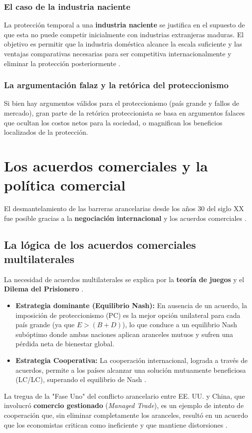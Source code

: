 \subsubsection{El caso de la industria naciente}
La protección temporal a una \textbf{industria naciente} se justifica en el supuesto de que esta no puede competir inicialmente con industrias extranjeras maduras. El objetivo es permitir que la industria doméstica alcance la escala suficiente y las ventajas comparativas necesarias para ser competitiva internacionalmente y eliminar la protección posteriormente .

\subsubsection{La argumentación falaz y la retórica del proteccionismo}
Si bien hay argumentos válidos para el proteccionismo (país grande y fallos de mercado), gran parte de la retórica proteccionista se basa en argumentos falaces que ocultan los costos netos para la sociedad, o magnifican los beneficios localizados de la protección.

\section{Los acuerdos comerciales y la política comercial}
El desmantelamiento de las barreras arancelarias desde los años 30 del siglo XX fue posible gracias a la \textbf{negociación internacional} y los acuerdos comerciales .

\subsection{La lógica de los acuerdos comerciales multilaterales}
La necesidad de acuerdos multilaterales se explica por la \textbf{teoría de juegos} y el \textbf{Dilema del Prisionero} .
\begin{itemize}
    \item \textbf{Estrategia dominante (Equilibrio Nash):} En ausencia de un acuerdo, la imposición de proteccionismo (PC) es la mejor opción unilateral para cada país grande (ya que $E > (B+D)$), lo que conduce a un equilibrio Nash subóptimo donde ambas naciones aplican aranceles mutuos y sufren una pérdida neta de bienestar global.
    \item \textbf{Estrategia Cooperativa:} La cooperación internacional, lograda a través de acuerdos, permite a los países alcanzar una solución mutuamente beneficiosa (LC/LC), superando el equilibrio de Nash .
\end{itemize}
La tregua de la "Fase Uno" del conflicto arancelario entre EE. UU. y China, que involucró \textbf{comercio gestionado} (\textit{Managed Trade}), es un ejemplo de intento de cooperación que, sin eliminar completamente los aranceles, resultó en un acuerdo que los economistas critican como ineficiente y que mantiene distorsiones .

